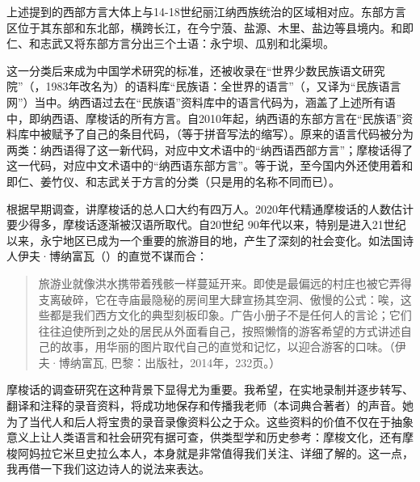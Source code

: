 {\noindent}上述提到的西部{方言}大体上与14-18世纪丽江纳西族统治的区域相对应。东部{方言}区位于其东部和东北部，横跨长江，在今宁蒗、盐源、木里、盐边等县境内。和即仁、和志武又将东部{方言}分出三个土语：永宁坝、瓜别和北渠坝。

这一分类后来成为中国学术研究的标准，还被收录在“世界少数民族语文研究院”（，1983年改名为）的语料库“民族语：全世界的语言”（，又译为“民族语言网”）当中\parencite{gordon2005}。{纳西}语过去在“民族语”资料库中的语言代码为，涵盖了上述所有语中，即纳西语、摩梭话的所有{方言}。自2010年起，{纳西}语的东部{方言}在“民族语”资料库中被赋予了自己的条目代码，（等于拼音写法的缩写）。原来的语言代码被分为两类：{纳西}语得了这一新代码，对应中文术语中的“{纳西}语西部{方言}”；摩梭话得了这一代码，对应中文术语中的“{纳西}语东部{方言}”。等于说，至今国内外还使用着和即仁、姜竹仪、和志武关于方言的分类（只是用的名称不同而已）。

根据早期调查，讲摩梭话的总人口大约有四万人\parencite[107]{heetal1985}。2020年代精通摩梭话的人数估计要少得多，摩梭话逐渐被汉语所取代。自20世纪 90年代以来，特别是进入21世纪以来，永宁地区已成为一个重要的旅游目的地，产生了深刻的社会变化\parencite{milan_tourisme_2019}。如法国诗人伊夫·博纳富瓦（）的直觉不谋而合：

\begin{quote}
    旅游业就像洪水携带着残骸一样蔓延开来。即使是最偏远的村庄也被它弄得支离破碎，它在寺庙最隐秘的房间里大肆宣扬其空洞、傲慢的公式：唉，这些都是我们西方文化的典型刻板印象。广告小册子不是任何人的言论；它们往往迫使所到之处的居民从外面看自己，按照懒惰的游客希望的方式讲述自己的故事，用华丽的图片取代自己的直觉和记忆，以迎合游客的口味。（伊夫·博纳富瓦,  巴黎：出版社，2014年，232页。）
\end{quote}

摩梭话的调查研究在这种背景下显得尤为重要。我希望，在实地录制并逐步转写、翻译和注释的录音资料，将成功地保存和传播我老师（本词典合著者）的声音。她为了当代人和后人将宝贵的录音录像资料公之于众。这些资料的价值不仅在于抽象意义上让人类语言和社会研究有据可查，供类型学和历史参考：摩梭文化，还有摩梭阿妈拉它米旦史拉么本人，本身就是非常值得我们关注、详细了解的。这一点，我再借一下我们这边诗人的说法来表达。

